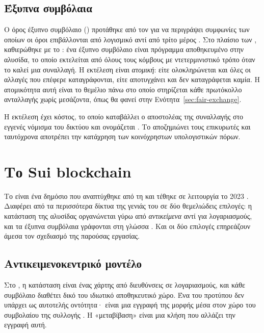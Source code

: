 \subsection{Έξυπνα συμβόλαια}

Ο όρος έξυπνο συμβόλαιο () προτάθηκε από τον  για να
περιγράψει συμφωνίες των οποίων οι όροι επιβάλλονται από λογισμικό αντί από τρίτο μέρος
\cite{szabo1997}. Στο πλαίσιο των , καθιερώθηκε με το 
\cite{buterin2014}: ένα έξυπνο συμβόλαιο είναι πρόγραμμα αποθηκευμένο στην αλυσίδα, το
οποίο εκτελείται από όλους τους κόμβους με ντετερμινιστικό τρόπο όταν το καλεί μια
συναλλαγή. Η εκτέλεση είναι \emph{ατομική}: είτε ολοκληρώνεται και όλες οι αλλαγές που
επέφερε καταγράφονται, είτε αποτυγχάνει και δεν καταγράφεται καμία. Η ατομικότητα αυτή
είναι το θεμέλιο πάνω στο οποίο στηρίζεται κάθε πρωτόκολλο ανταλλαγής χωρίς μεσάζοντα,
όπως θα φανεί στην Ενότητα~\ref{sec:fair-exchange}.

Η εκτέλεση έχει κόστος, το οποίο καταβάλλει ο αποστολέας της συναλλαγής στο εγγενές
νόμισμα του δικτύου και ονομάζεται . Το  αποζημιώνει τους επικυρωτές και
ταυτόχρονα αποτρέπει την κατάχρηση των κοινόχρηστων υπολογιστικών πόρων.

\section{Το Sui blockchain}
\label{sec:sui}

Το  είναι ένα δημόσιο   που αναπτύχθηκε από τη
 και τέθηκε σε λειτουργία το 2023 \cite{sui-whitepaper, sui-docs}. Διαφέρει από τα
περισσότερα δίκτυα της γενιάς του  σε δύο θεμελιώδεις επιλογές: η κατάσταση
της αλυσίδας οργανώνεται γύρω από \emph{αντικείμενα} αντί για λογαριασμούς, και τα έξυπνα
συμβόλαια γράφονται στη γλώσσα . Και οι δύο επιλογές επηρεάζουν άμεσα τον
σχεδιασμό της παρούσας εργασίας.

\subsection{Αντικειμενοκεντρικό μοντέλο}
\label{sec:object-model}

Στο , η κατάσταση είναι ένας χάρτης από διευθύνσεις σε λογαριασμούς, και κάθε
συμβόλαιο διαθέτει δικό του ιδιωτικό αποθηκευτικό χώρο. Ένα  του προτύπου
 δεν υπάρχει ως αυτοτελής οντότητα· είναι μια εγγραφή της μορφής
 μέσα στον χώρο του συμβολαίου της συλλογής \cite{erc721}. Η
«μεταβίβαση» είναι μια κλήση που αλλάζει την εγγραφή αυτή.

